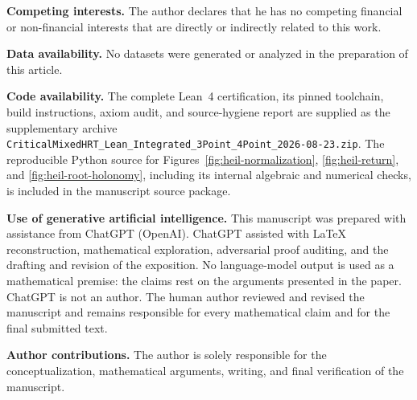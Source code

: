 \documentclass[reqno]{amsart}
\theoremstyle{remark}
\numberwithin{equation}{section}
\newcommand{\certarchive}{\nolinkurl{CriticalMixedHRT_Lean_Integrated_3Point_4Point_2026-08-23.zip}}
\begin{document}
\smallskip
\noindent
\textbf{Competing interests.}
The author declares that he has no competing financial or non-financial
interests that are directly or indirectly related to this work.

\smallskip
\noindent
\textbf{Data availability.}
No datasets were generated or analyzed in the preparation of this article.

\smallskip
\noindent
\textbf{Code availability.}
The complete Lean~4 certification, its pinned toolchain, build instructions,
axiom audit, and source-hygiene report are supplied as the supplementary
archive \certarchive{}. The reproducible Python source for
Figures~\ref{fig:heil-normalization}, \ref{fig:heil-return}, and
\ref{fig:heil-root-holonomy}, including its internal algebraic and numerical
checks, is included in the manuscript source package.

\smallskip
\noindent
\textbf{Use of generative artificial intelligence.}
This manuscript was prepared with assistance from ChatGPT (OpenAI). ChatGPT
assisted with LaTeX reconstruction, mathematical exploration, adversarial
proof auditing, and the drafting and revision of the exposition. No
language-model output is used as a mathematical premise: the claims rest on
the arguments presented in the paper. ChatGPT is not an author. The human
author reviewed and revised the manuscript and remains responsible for every
mathematical claim and for the final submitted text.

\smallskip
\noindent
\textbf{Author contributions.}
The author is solely responsible for the conceptualization, mathematical
arguments, writing, and final verification of the manuscript.
\end{document}

